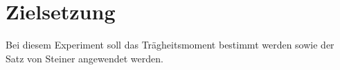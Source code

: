 \section{Zielsetzung}
\label{sec:Zielsetzung}

Bei diesem Experiment soll das Trägheitsmoment bestimmt werden sowie der 
Satz von Steiner angewendet werden.